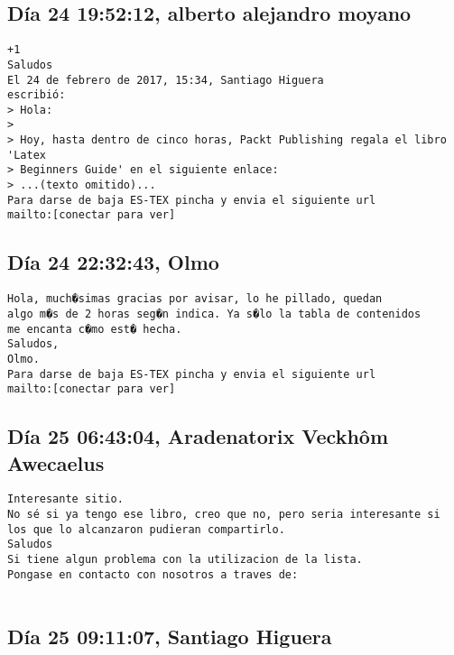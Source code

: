 \documentclass[a4paper,10pt]{article}
\begin{document}
\subsection{Día 24 19:52:12, alberto alejandro moyano}

\begin{lstlisting}
+1
Saludos
El 24 de febrero de 2017, 15:34, Santiago Higuera 
escribió:
> Hola:
>
> Hoy, hasta dentro de cinco horas, Packt Publishing regala el libro 'Latex
> Beginners Guide' en el siguiente enlace:
> ...(texto omitido)...
Para darse de baja ES-TEX pincha y envia el siguiente url
mailto:[conectar para ver]

\end{lstlisting}

\subsection{Día 24 22:32:43, Olmo}

\begin{lstlisting}
Hola, much�simas gracias por avisar, lo he pillado, quedan
algo m�s de 2 horas seg�n indica. Ya s�lo la tabla de contenidos
me encanta c�mo est� hecha.
Saludos,
Olmo.
Para darse de baja ES-TEX pincha y envia el siguiente url
mailto:[conectar para ver]

\end{lstlisting}

\subsection{Día 25 06:43:04, Aradenatorix Veckhôm Awecaelus}

\begin{lstlisting}
Interesante sitio.
No sé si ya tengo ese libro, creo que no, pero seria interesante si
los que lo alcanzaron pudieran compartirlo.
Saludos
Si tiene algun problema con la utilizacion de la lista.
Pongase en contacto con nosotros a traves de:


\end{lstlisting}

\subsection{Día 25 09:11:07, Santiago Higuera}
\end{document}
